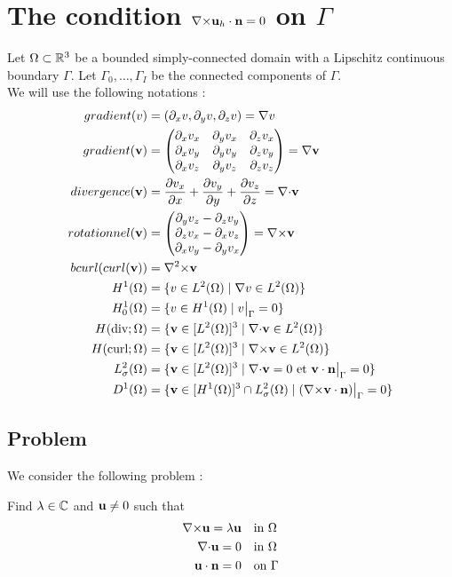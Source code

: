 \section{The condition ${\nabla\times} {\mathbf{u}}_h\cdot{\mathbf{n}}=0$ on $\Gamma$}
Let $\Omega\subset{\mathbb{R}}^3$ be a bounded simply-connected domain with a
Lipschitz continuous boundary $\Gamma$. Let $\Gamma_0,\dots,\Gamma_I$
be the connected components of $\Gamma$.\\

We will use the following notations :
\begin{align*}
gradient(v)&=(\partial_x v, \partial_y v, \partial_z v)={\nabla} v\\
gradient({\mathbf{v}})&=\begin{pmatrix}
\partial_x v_x & \partial_y v_x & \partial_z v_x\\
\partial_x v_y & \partial_y v_y & \partial_z v_y\\
\partial_x v_z & \partial_y v_z & \partial_z v_z
\end{pmatrix}={\nabla}{\mathbf{v}}\\
divergence({\mathbf{v}})&=\frac{\partial v_x}{\partial x}+\frac{\partial v_y}{\partial y}+\frac{\partial v_z}{\partial z}={\nabla\cdot} {\mathbf{v}}\\
rotationnel({\mathbf{v}})&=\begin{pmatrix}
\partial_y v_z - \partial_z v_y\\
\partial_z v_x - \partial_x v_z\\
\partial_x v_y - \partial_y v_x
\end{pmatrix}={\nabla\times} {\mathbf{v}}\\
bcurl(curl({\mathbf{v}}))&={\nabla^2\times} {\mathbf{v}}\\
H^1(\Omega) &= \{v \in L^2(\Omega)\;|\; {\nabla} v\in L^2(\Omega)\}\\
H^1_0(\Omega) &= \{v \in H^1(\Omega)\; |\; v{\big\rvert_{\Gamma}} = 0\}\\
H(\mathrm{div};\Omega) &= \{{\mathbf{v}} \in [L^2(\Omega)]^3\; |\; {\nabla\cdot}{\mathbf{v}} \in L^2(\Omega) \}\\
H(\mathrm{curl};\Omega) &= \{{\mathbf{v}} \in [L^2(\Omega)]^3\; |\; {\nabla\times}{\mathbf{v}} \in L^2(\Omega) \}\\
L^2_\sigma(\Omega) &= \{{\mathbf{v}} \in [L^2(\Omega)]^3\; |\; {\nabla\cdot} {\mathbf{v}} = 0\text{ et }{\mathbf{v}}\cdot {\mathbf{n}}{\big\rvert_{\Gamma}} = 0 \}\\
D^1(\Omega) &= \{{\mathbf{v}} \in [H^1(\Omega)]^3\cap L^2_\sigma(\Omega)\; |\; ({\nabla\times} {\mathbf{v}}\cdot {\mathbf{n}}){\big\rvert_{\Gamma}} = 0  \}
\end{align*}

\subsection{Problem}
We consider the following problem :
\begin{pb}\label{pb1}
Find $\lambda\in{\mathbb{C}}$ and ${\mathbf{u}}\ne 0$ such that
\begin{align}
{\nabla\times}{\mathbf{u}} = \lambda{\mathbf{u}} & \quad \mbox{in }\Omega\\
{\nabla\cdot}{\mathbf{u}} = 0 & \quad \mbox{in }\Omega\\
{\mathbf{u}}\cdot {\mathbf{n}} = 0 & \quad \mbox{on }\Gamma
\end{align}
\end{pb}

